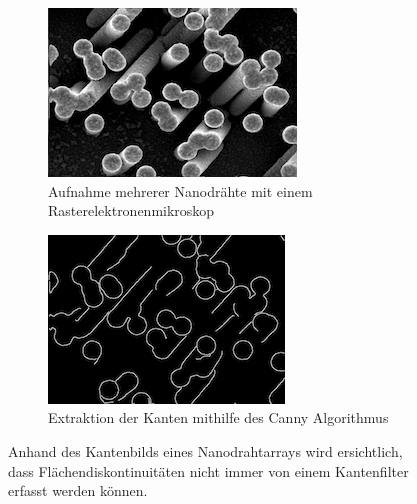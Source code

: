 \documentclass[accentcolor=tud1c, 11pt, toc=bib, toc=listof, captions=abovetable, parskip=half]{tudreport}
\begin{document}
\begin{figure}[h!]
    \centering
    \begin{subfigure}[b]{0.475\textwidth}
        \centering
        \includegraphics[scale=0.8]{Figures/remScharf.png}
        \caption{Aufnahme mehrerer Nanodrähte mit einem Rasterelektronenmikroskop}
        \label{fig:remScharf1}
    \end{subfigure}
    \hfill
    \begin{subfigure}[b]{0.475\textwidth}
        \centering
        \includegraphics[scale=0.77]{Figures/remScharfEdge.png}
        \caption{Extraktion der Kanten mithilfe des Canny Algorithmus}
        \label{fig:remScharf1Edge}
    \end{subfigure}
    \caption{Anhand des Kantenbilds eines Nanodrahtarrays wird ersichtlich, dass Flächendiskontinuitäten nicht immer von einem Kantenfilter erfasst werden können. }
\end{figure}
\quad
\end{document}
